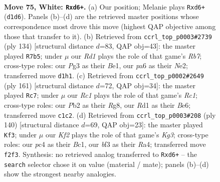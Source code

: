\documentclass[11pt]{article}
\begin{document}
\clearpage

\begin{figure}[p]\centering
\begin{subfigure}{0.46\textwidth}\centering
\resizebox{\linewidth}{!}{%
\newchessgame
\chessboard[
  setfen={8/3k2B1/p2b2rr/Ppp2p1p/2p2P1P/4PbP1/1P3K2/2RR4 w - - 0 75},
  showmover=false,
  pgfstyle=straightmove, color=movearrow, markmove={d1-d6}
]}
\caption{}
\end{subfigure}\hfill
\begin{subfigure}{0.46\textwidth}\centering
\resizebox{\linewidth}{!}{%
\newchessgame
\chessboard[
  setfen={rr6/1Rbk1p2/2n1p1p1/p1PpP3/P4PKP/8/1R2N3/4B3 w - - 27 68},
  showmover=false,
  pgfstyle=straightmove, color=movearrow, markmove={b7-b5}
]}
\caption{}
\end{subfigure}
\\[4pt]
\begin{subfigure}{0.46\textwidth}\centering
\resizebox{\linewidth}{!}{%
\newchessgame
\chessboard[
  setfen={2r3r1/4kp2/1p2bRp1/p2pP2p/P2K3P/2P5/1P2BRP1/8 b - - 6 81},
  showmover=false,
  pgfstyle=straightmove, color=movearrow, markmove={c8-c7}
]}
\caption{}
\end{subfigure}\hfill
\begin{subfigure}{0.46\textwidth}\centering
\resizebox{\linewidth}{!}{%
\newchessgame
\chessboard[
  setfen={8/5kp1/2rbp2p/p5rP/R1pP1P2/2P3K1/1P5R/2B5 w - - 68 71},
  showmover=false,
  pgfstyle=straightmove, color=movearrow, markmove={g3-f3}
]}
\caption{}
\end{subfigure}
\caption{\textbf{Move 75, White: \texttt{Rxd6+}.} (a) Our position; Melanie plays \texttt{Rxd6+} (\texttt{d1d6}). Panels (b)--(d) are the retrieved master positions whose correspondence most drove this move (highest QAP objective among those that transfer to it). (b) Retrieved from \texttt{ccrl\_top\_p0003\#2739} (ply 134) [structural distance $d$=83, QAP obj=43]: the master played \texttt{R7b5}; under $\mu$ our \emph{Rd1} plays the role of that game's \emph{Rb7}; cross-type roles: our \emph{P}g3 as their \emph{B}e1, our \emph{p}a6 as their \emph{N}e2; transferred move \texttt{d1h1}. (c) Retrieved from \texttt{ccrl\_top\_p0002\#2649} (ply 161) [structural distance $d$=72, QAP obj=34]: the master played \texttt{Rc7}; under $\mu$ our \emph{Rc1} plays the role of that game's \emph{Rc1}; cross-type roles: our \emph{P}b2 as their \emph{R}g8, our \emph{R}d1 as their \emph{B}e6; transferred move \texttt{c1c2}. (d) Retrieved from \texttt{ccrl\_top\_p0003\#208} (ply 140) [structural distance $d$=69, QAP obj=23]: the master played \texttt{Kf3}; under $\mu$ our \emph{Kf2} plays the role of that game's \emph{Kg3}; cross-type roles: our \emph{p}c4 as their \emph{B}c1, our \emph{b}f3 as their \emph{R}a4; transferred move \texttt{f2f3}. Synthesis: no retrieved analog transferred to \texttt{Rxd6+} -- the \texttt{search} selector chose it on value (material / mate); panels (b)--(d) show the strongest nearby analogies.}
\label{fig:thought-m148}
\end{figure}
\end{document}
